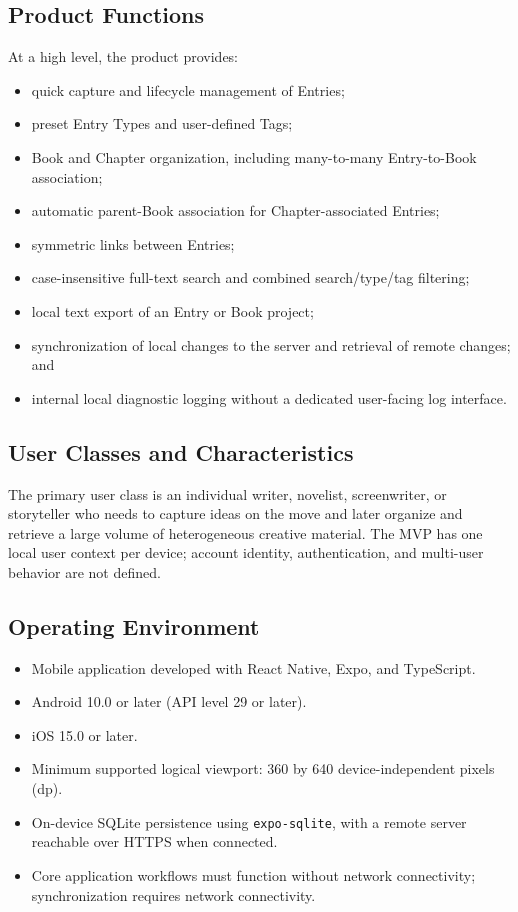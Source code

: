 \documentclass[11pt,a4paper]{article}
\begin{document}
\subsection{Product Functions}
At a high level, the product provides:
\begin{itemize}
  \item quick capture and lifecycle management of Entries;
  \item preset Entry Types and user-defined Tags;
  \item Book and Chapter organization, including many-to-many Entry-to-Book association;
  \item automatic parent-Book association for Chapter-associated Entries;
  \item symmetric links between Entries;
  \item case-insensitive full-text search and combined search/type/tag filtering;
  \item local text export of an Entry or Book project;
  \item synchronization of local changes to the server and retrieval of remote changes; and
  \item internal local diagnostic logging without a dedicated user-facing log interface.
\end{itemize}

\subsection{User Classes and Characteristics}
The primary user class is an individual writer, novelist, screenwriter, or storyteller who needs to capture ideas on the move and later organize and retrieve a large volume of heterogeneous creative material. The MVP has one local user context per device; account identity, authentication, and multi-user behavior are not defined.

\subsection{Operating Environment}
\begin{itemize}
  \item Mobile application developed with React Native, Expo, and TypeScript.
  \item Android 10.0 or later (API level 29 or later).
  \item iOS 15.0 or later.
  \item Minimum supported logical viewport: 360 by 640 device-independent pixels (dp).
  \item On-device SQLite persistence using \texttt{expo-sqlite}, with a remote server reachable over HTTPS when connected.
  \item Core application workflows must function without network connectivity; synchronization requires network connectivity.
\end{itemize}
\end{document}
